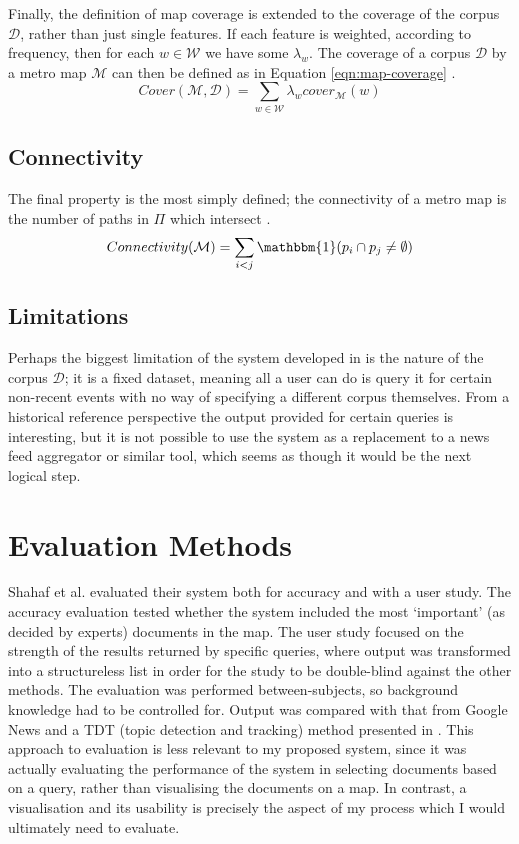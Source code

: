 Finally, the definition of map coverage is extended to the coverage of the corpus $\mathcal{D}$, rather than just single features. If each feature is weighted, according to frequency, then for each $w \in \mathcal{W}$ we have some $\lambda_w$. The coverage of a corpus $\mathcal{D}$ by a metro map $\mathcal{M}$ can then be defined as in Equation \ref{eqn:map-coverage} \citep{GeneratingInformationMaps}.
\begin{equation}
	\label{eqn:map-coverage}
	Cover(\mathcal{M}, \mathcal{D}) = \sum_{w \in \mathcal{W}}\lambda_w cover_\mathcal{M}(w)
\end{equation}

\subsection{Connectivity}
The final property is the most simply defined; the connectivity of a metro map is the number of paths in $\Pi$ which intersect \citep{GeneratingInformationMaps}.
\begin{equation}
	Connectivity(\mathcal{M}) = \sum_{i<j}\mathbbm{1}(p_i \cap p_j \neq\emptyset)
\end{equation}

\subsection{Limitations}
Perhaps the biggest limitation of the system developed in \citep{GeneratingInformationMaps, InformationCartographyPre} is the nature of the corpus $\mathcal{D}$; it is a fixed dataset, meaning all a user can do is query it for certain non-recent events with no way of specifying a different corpus themselves. From a historical reference perspective the output provided for certain queries is interesting, but it is not possible to use the system as a replacement to a news feed aggregator or similar tool, which seems as though it would be the next logical step.

\section{Evaluation Methods}
Shahaf et al. \citep{GeneratingInformationMaps} evaluated their system both for accuracy and with a user study. The accuracy evaluation tested whether the system included the most `important' (as decided by experts) documents in the map. The user study focused on the strength of the results returned by specific queries, where output was transformed into a structureless list in order for the study to be double-blind against the other methods. The evaluation was performed between-subjects, so background knowledge had to be controlled for. Output was compared with that from Google News and a TDT (topic detection and tracking) method presented in \citep{SemanticLanguageModelsForTDT}. This approach to evaluation is less relevant to my proposed system, since it was actually evaluating the performance of the system in selecting documents based on a query, rather than visualising the documents on a map. In contrast, a visualisation and its usability is precisely the aspect of my process which I would ultimately need to evaluate.

